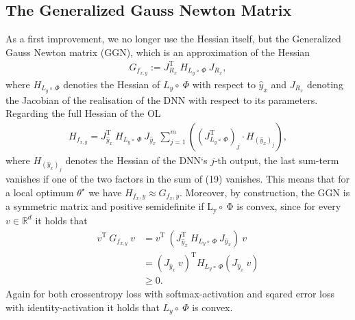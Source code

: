 \documentclass[conference]{IEEEtran}
\begin{document}
\subsection{The Generalized Gauss Newton Matrix}
As a first improvement, we no longer use the Hessian itself, but the Generalized Gauss Newton matrix (GGN), which is an approximation of the Hessian 
\begin{align}
G_{f_{x, y}} := J_{R_{x}}^{\mathrm{T}}\:H_{L_{y}\circ\:\Phi}\:J_{R_{x}},
\end{align}
where $H_{L_{y}\circ\:\Phi}$ denoties the Hessian of $L_{y}\circ\:\Phi$ with respect to $\hat{y}_{x}$ and $J_{R_{x}}$ denoting the Jacobian of the realisation of the DNN with respect to its parameters.
Regarding the full Hessian of the OL
\begin{align}
H_{f_{x, y}} = J_{\hat{y}_{x}}^{\mathrm{T}}\:H_{L_{y}\circ\:\Phi}\:J_{\hat{y}_{x}}\:\sum_{j = 1}^{m}\left(\left(J_{L_{y}\circ \:\Phi}^{\mathrm{T}}\right)_{j}\cdot H_{(\hat{y}_{x})_{j}}\right),
\end{align}
where $H_{(\hat{y}_{x})_{j}}$ denotes the Hessian of the DNN`s  $j$-th output, the last sum-term vanishes if one of the two factors in the sum of (19) vanishes.
This means that for a local optimum $\theta^{\star}$ we have $H_{f_x, y} \approx G_{f_x, y}$.   Moreover, by construction, the GGN is a symmetric matrix and positive semidefinite if $\mathrm{L_{y}\circ\:\Phi}$ is convex, since for every $v\in\mathbb{R}^{d}$ it holds that
\begin{align}
v^{\mathrm{T}}\:G_{f_{x, y}}\:v &= v^{\mathrm{T}}\:\left( J_{\hat{y}_{x}}^{\mathrm{T}}\:H_{L_{y}\circ\:\Phi}\:J_{\hat{y}_{x}}\right)\:v\\
&= \left(J_{\hat{y}_{x}}\:v\right)^{\mathrm{T}}H_{L_{y}\circ\:\Phi}\left(J_{\hat{y}_{x}}\:v\right) \\
&\geq 0.
\end{align}
Again for both crossentropy loss with softmax-activation and sqared error loss with identity-activation it holds that $L_{y}\circ\:\Phi$ is convex.
\end{document}
